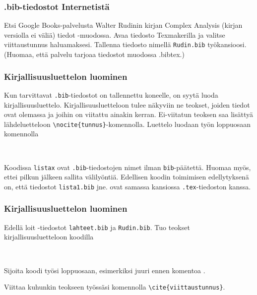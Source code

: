 \begin{frame}[fragile]
    \frametitle{.bib-tiedostot Internetistä}
    \begin{harj}
        Etsi Google Books-palvelusta Walter Rudinin kirjan Complex Analysis (kirjan versiolla ei väliä) tiedot \BibTeX -muodossa. Avaa tiedosto Texmakerilla ja valitse viittaustunnus haluamaksesi. Tallenna tiedosto nimellä \verb-Rudin.bib- työkansioosi. (Huomaa, että palvelu tarjoaa tiedostot muodossa .bibtex.)
    \end{harj}

\end{frame}
\begin{frame}[fragile]
    \frametitle{Kirjallisuusluettelon luominen}
    Kun tarvittavat \verb-.bib--tiedostot on tallennettu koneelle, on syytä luoda kirjallisuusluettelo. Kirjallisuusluetteloon tulee näkyviin ne teokset, joiden tiedot ovat olemassa ja joihin on viitattu ainakin kerran. Ei-viitatun teoksen saa lisättyä lähdeluetteloon \verb-\nocite{tunnus}--komennolla.
    \vaihto
    Luettelo luodaan työn loppuosaan komennolla
    \begin{Verbatim}[frame=single]


    \end{Verbatim}
    Koodissa \verb-listax- ovat \verb-.bib--tiedostojen nimet ilman \verb-bib--päätettä. Huomaa myös, ettei pilkun jälkeen sallita välilyöntiä.
    \vaihto
    Edellisen koodin toimimisen edellytyksenä on, että tiedostot \verb-lista1.bib- jne. ovat samassa kansiossa \verb-.tex--tiedoston kanssa. 
\end{frame}
\begin{frame}[fragile]
    \frametitle{Kirjallisuusluettelon luominen}
    \begin{harj}
        Edellä loit \BibTeX-tiedostot \verb-lahteet.bib- ja \verb-Rudin.bib-. Tuo teokset kirjallisuusluetteloon koodilla 
        \begin{Verbatim}[frame=single]


        \end{Verbatim}
        Sijoita koodi työsi loppuosaan, esimerkiksi juuri ennen komentoa \verb--.
    \end{harj}
    \begin{harj}
        Viittaa kuhunkin teokseen työssäsi komennolla \verb-\cite{viittaustunnus}-.
    \end{harj}
\end{frame}
